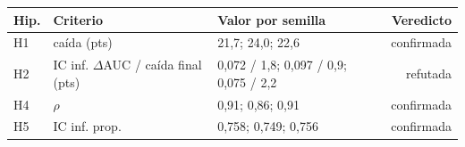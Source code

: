\begin{tabular}{lllr}
\toprule
Hip. & Criterio & Valor por semilla & Veredicto \\
\midrule
H1 & caída (pts) & 21,7; 24,0; 22,6 & confirmada \\
H2 & IC inf. $\Delta$AUC / caída final (pts) & 0,072 / 1,8; 0,097 / 0,9; 0,075 / 2,2 & refutada \\
H4 & $\rho$ & 0,91; 0,86; 0,91 & confirmada \\
H5 & IC inf. prop. & 0,758; 0,749; 0,756 & confirmada \\
\bottomrule
\end{tabular}
